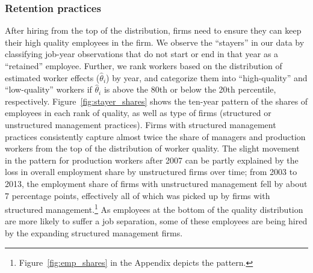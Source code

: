 \subsubsection{Retention practices}
After hiring from the top of the distribution, firms need to ensure they can keep their high quality employees in the firm. We observe the ``stayers'' in our data by classifying job-year observations that do not start or end in that year as a ``retained'' employee. Further, we rank workers based on the distribution of estimated worker effects ($\hat\theta_i$) by year, and categorize them into ``high-quality''  and ``low-quality'' workers if $\hat\theta_i$ is above the 80th or below the 20th percentile, respectively. Figure~\ref{fig:stayer_shares} shows the ten-year pattern of the shares of employees in each rank of quality, as well as type of firms (structured or unstructured management practices). Firms with structured management practices consistently capture almost twice the share of managers and production workers from the top of the distribution of worker quality. The slight movement in the pattern for production workers after 2007 can be partly explained by the loss in overall employment share by unstructured firms over time; from 2003 to 2013, the employment share of firms with unstructured management fell by about 7 percentage points, effectively all of which was picked up by firms with structured management.\footnote{Figure~\ref{fig:emp_shares} in the Appendix depicts the pattern.} As employees at the bottom of the quality distribution are more likely to suffer a job separation, some of these employees are being hired by the expanding structured management firms.


